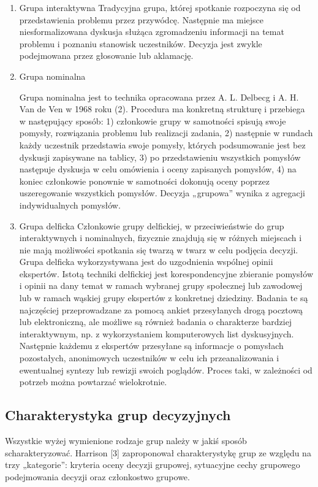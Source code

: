 \begin{enumerate}[1)]
  \item Grupa interaktywna
  Tradycyjna grupa, której spotkanie rozpoczyna się od przedstawienia problemu przez 
  przywódcę. Następnie ma miejsce niesformalizowana dyskusja służąca zgromadzeniu 
  informacji na temat problemu i poznaniu stanowisk uczestników. Decyzja jest zwykle 
  podejmowana przez głosowanie lub aklamację.

  \item Grupa nominalna
  
  Grupa nominalna jest to technika opracowana przez A. L. Delbecg i A. H. Van de Ven w 1968 roku (2). 
  Procedura ma konkretną strukturę i przebiega w następujący sposób: 1) członkowie grupy w samotności 
  spisują swoje pomysły, rozwiązania problemu lub realizacji zadania, 2) następnie w rundach 
  każdy uczestnik przedstawia swoje pomysły, których podsumowanie jest bez dyskusji zapisywane 
  na tablicy, 3) po przedstawieniu wszystkich pomysłów następuje dyskusja w celu omówienia i oceny 
  zapisanych pomysłów, 4) na koniec członkowie ponownie w samotności dokonują oceny 
  poprzez uszeregowanie wszystkich pomysłów. Decyzja „grupowa” wynika z agregacji indywidualnych pomysłów.

  \item Grupa delficka
  Członkowie grupy delfickiej, w przeciwieństwie do grup
  interaktywnych i nominalnych, fizycznie znajdują się w różnych miejscach i
  nie mają możliwości spotkania się twarzą w twarz w celu podjęcia decyzji.
  Grupa delficka wykorzystywana jest do uzgodnienia wspólnej opinii ekspertów. 
  Istotą techniki delfickiej jest korespondencyjne zbieranie pomysłów i opinii 
  na dany temat w ramach wybranej grupy społecznej lub zawodowej lub w ramach 
  wąskiej grupy ekspertów z konkretnej dziedziny. Badania te są najczęściej 
  przeprowadzane za pomocą ankiet przesyłanych drogą pocztową lub elektroniczną,
  ale możliwe są również badania o charakterze bardziej interaktywnym, np.
  z wykorzystaniem  komputerowych list dyskusyjnych. Następnie każdemu z
  ekspertów przesyłane są informacje o pomysłach pozostałych, anonimowych 
  uczestników w celu ich przeanalizowania i ewentualnej syntezy lub rewizji 
  swoich poglądów. Proces taki, w zależności od potrzeb można powtarzać 
  wielokrotnie.

\end{enumerate}


\subsection{Charakterystyka grup decyzyjnych}
Wszystkie wyżej wymienione rodzaje grup należy w jakiś sposób scharakteryzować. 
Harrison [3] zaproponował charakterystykę grup ze względu na trzy „kategorie”: 
kryteria oceny decyzji grupowej, sytuacyjne cechy grupowego podejmowania decyzji oraz członkostwo grupowe.

